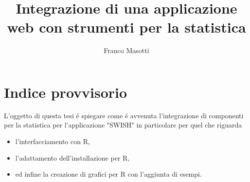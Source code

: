 \documentclass[10pt,titlepage,twoside,a4paper]{report}
\title{Integrazione di una applicazione web con strumenti per la statistica}
\author{Franco Masotti}
\begin{document}

\maketitle
\newpage
\tableofcontents
\newpage
\listoffigures
\newpage
\listoftables
\newpage
\listoflistings
\cleardoublepage


\iffalse

\chapter{Indice provvisorio} \label{Indice provvisorio}
L'oggetto di questa tesi \'e spiegare come \'e avvenuta l'integrazione di 
componenti per la statistica per l'applicazione "SWISH" in particolare
per quel che riguarda
\begin{itemize}
    \item l'interfacciamento con R,
    \item l'adattamento dell'installazione per R,
    \item ed infine la creazione di grafici per R con l'aggiunta di esempi.
\end{itemize}
\end{document}
